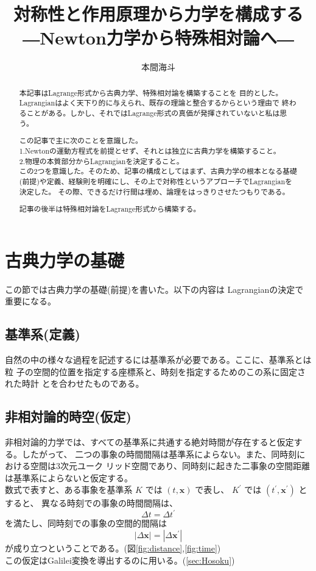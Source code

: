 \documentclass[a4paper,11pt]{ltjsarticle}
\title{対称性と作用原理から力学を構成する
\\―Newton力学から特殊相対論へ―}
\author{本間海斗}
\date{}
\begin{document}
\maketitle

\begin{abstract}
本記事はLagrange形式から古典力学、特殊相対論を構築することを
目的とした。Lagrangianはよく天下り的に与えられ、既存の理論と整合するからという理由で
終わることがある。しかし、それではLagrange形式の真価が発揮されていないと私は思う。

この記事で主に次のことを意識した。\\
1.Newtonの運動方程式を前提とせず、それとは独立に古典力学を構築すること。
\\2.物理の本質部分からLagrangianを決定すること。
\\この2つを意識した。そのため、記事の構成としてはまず、古典力学の根本となる基礎
(前提)や定義、経験則を明確にし、その上で対称性というアプローチでLagrangianを決定した。
その際、できるだけ行間は埋め、論理をはっきりさせたつもりである。

記事の後半は特殊相対論をLagrange形式から構築する。
\end{abstract}

\tableofcontents

\section{古典力学の基礎}
この節では古典力学の基礎(前提)を書いた。以下の内容は
Lagrangianの決定で重要になる。


\subsection{基準系(定義)}

自然の中の様々な過程を記述するには基準系が必要である。ここに、基準系とは粒
子の空間的位置を指定する座標系と、時刻を指定するためのこの系に固定された時計
とを合わせたものである。

\FloatBarrier
\subsection{非相対論的時空(仮定)}
\label{sec:Spacetime}
非相対論的力学では、すべての基準系に共通する絶対時間が存在すると仮定する。したがって、
二つの事象の時間間隔は基準系によらない。また、同時刻における空間は3次元ユーク
リッド空間であり、同時刻に起きた二事象の空間距離は基準系によらないと仮定する。
\\数式で表すと、ある事象を基準系 $K$ では $(t,\bm{x})$ で表し、 $K^\prime$ では $(t^\prime , \bm{x}^\prime)$ とすると、
異なる時刻での事象の時間間隔は、
\[
\varDelta t=\varDelta t^\prime
\]
を満たし、同時刻での事象の空間的間隔は
\[
|\varDelta\bm{x}|=|\varDelta\bm{x}^\prime|
\]
が成り立つということである。(図\ref{fig:distance},\ref{fig:time})
\\この仮定はGalilei変換を導出するのに用いる。(\ref{sec:Hosoku})
\end{document}
